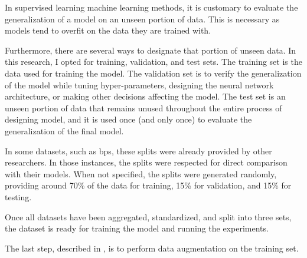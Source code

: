 
In supervised learning machine learning methods, it is
customary to evaluate the generalization of a model on an
unseen portion of data. This is necessary as models tend to
\gls{overfit} on the data they are trained with.

Furthermore, there are several ways to designate that
portion of unseen data. In this research, I opted for
training, validation, and test sets. The training set is the
data used for training the model. The validation set is to
verify the generalization of the model while tuning
hyper-parameters, designing the neural network architecture,
or making other decisions affecting the model. The test set
is an unseen portion of data that remains unused throughout
the entire process of designing model, and it is used once
(and only once) to evaluate the generalization of the final
model.

In some datasets, such as \gls{bps}, these splits were
already provided by other researchers. In those instances,
the splits were respected for direct comparison with their
models. When not specified, the splits were generated
randomly, providing around 70\% of the data for training,
15\% for validation, and 15\% for testing.

Once all datasets have been aggregated, standardized, and
split into three sets, the dataset is ready for training the
model and running the experiments.

The last step, described in , is to
perform data augmentation on the training set.

